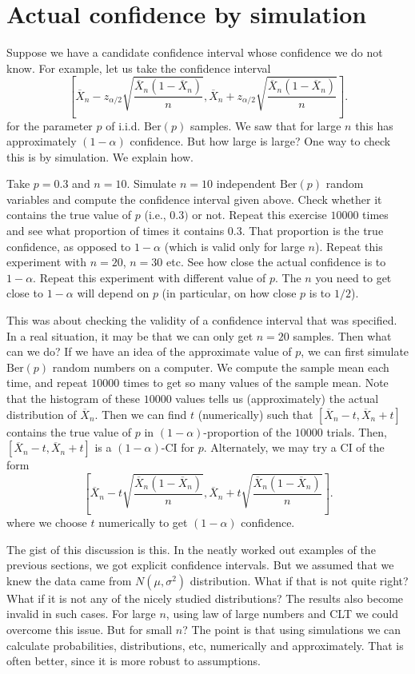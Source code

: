 \documentclass[preprint,  11pt]{amsart}
\newcommand{\para}[1]{\vspace{4mm}\noindent{\bfseries #1:}}
\theoremstyle{plain} %
\theoremstyle{definition} %
\begin{document}
\section{Actual confidence by simulation}
Suppose we have a candidate confidence interval whose confidence we do not know. For example, let us take the confidence interval $$
\left[\overline{X}_{n}-z_{\alpha/2}\sqrt{\frac{\overline{X}_{n}(1-\overline{X}_{n})}{n}}, \overline{X}_{n}+z_{\alpha/2}\sqrt{\frac{\overline{X}_{n}(1-\overline{X}_{n})}{n}}\right].
$$ for the parameter $p$ of i.i.d. $\mbox{Ber}(p)$ samples. We saw that for large $n$ this has approximately $(1-\alpha)$ confidence. But how large is large? One way to check this is by simulation. We explain how.

Take $p=0.3$ and $n=10$. Simulate $n=10$ independent $\mbox{Ber}(p)$ random variables and compute the confidence interval given above. Check whether it contains the true value of $p$ (i.e., $0.3)$ or not. Repeat this exercise $10000$ times and see what proportion of times it contains $0.3$. That proportion is the true confidence, as opposed to $1-\alpha$ (which is valid only for large $n$). Repeat this experiment with $n=20$, $n=30$ etc. See how close the actual confidence is to $1-\alpha$. Repeat this experiment with different value of $p$. The $n$ you need to get close to $1-\alpha$ will depend on $p$ (in particular, on how close $p$ is to $1/2$).

This was about checking the validity of a confidence interval that was specified. In a real situation, it may be that we can only get $n=20$ samples. Then what can we do? If we have an idea of the approximate value of $p$, we can first simulate $\mbox{Ber}(p)$ random numbers on a computer. We compute the sample mean each time, and repeat  $10000$ times to get so many values of the sample mean. Note that the histogram of these $10000$ values tells us (approximately) the actual distribution of $\overline{X}_{n}$. Then we can find $t$ (numerically) such that $[\overline{X}_{n}-t,\overline{X}_{n}+t]$ contains the true value of $p$ in $(1-\alpha)$-proportion of the $10000$ trials. Then, $[\overline{X}_{n}-t,\overline{X}_{n}+t]$ is a $(1-\alpha)$-CI for $p$. Alternately, we may try a CI of the form $$
\left[\overline{X}_{n}-t\sqrt{\frac{\overline{X}_{n}(1-\overline{X}_{n})}{n}}, \overline{X}_{n}+t\sqrt{\frac{\overline{X}_{n}(1-\overline{X}_{n})}{n}}\right].
$$
where we choose $t$ numerically to get $(1-\alpha)$ confidence.

\para{Summary} The gist of this discussion is this. In the neatly worked out examples of the previous sections, we got explicit confidence intervals. But we assumed that we knew the data came from $N(\mu,{\sigma}^{2})$ distribution. What if that is not quite right? What if it is not any of the nicely studied distributions? The results also become invalid in such cases. For large $n$, using law of large numbers and CLT we could overcome this issue. But for small $n$? The point is that using simulations we can calculate probabilities, distributions, etc, numerically and approximately. That is often better, since it is more robust to assumptions.
\end{document}

